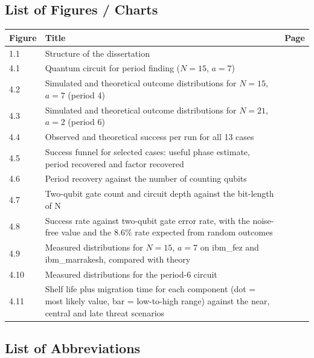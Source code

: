 \documentclass[12pt,oneside]{report}
\begin{document}
\subsection*{List of Figures / Charts}

\begin{center}\small\begin{tabularx}{\textwidth}{|P{0.1\textwidth}|W|P{0.1\textwidth}|}\hline
Figure & Title & Page \\ & Structure of the dissertation & \pageref{fig:1.1} \\ & Quantum circuit for period finding ($N = 15$, $a = 7$) & \pageref{fig:4.1} \\ & Simulated and theoretical outcome distributions for $N = 15$, $a = 7$ (period 4) & \pageref{fig:4.2} \\ & Simulated and theoretical outcome distributions for $N = 21$, $a = 2$ (period 6) & \pageref{fig:4.3} \\ & Observed and theoretical success per run for all 13 cases & \pageref{fig:4.4} \\ & Success funnel for selected cases: useful phase estimate, period recovered and factor recovered & \pageref{fig:4.5} \\ & Period recovery against the number of counting qubits & \pageref{fig:4.6} \\ & Two-qubit gate count and circuit depth against the bit-length of N & \pageref{fig:4.7} \\ & Success rate against two-qubit gate error rate, with the noise-free value and the 8.6\% rate expected from random outcomes & \pageref{fig:4.8} \\ & Measured distributions for $N = 15$, $a = 7$ on ibm\_fez and ibm\_marrakesh, compared with theory & \pageref{fig:4.9} \\ & Measured distributions for the period-6 circuit & \pageref{fig:4.10} \\ & Shelf life plus migration time for each component (dot = most likely value, bar = low-to-high range) against the near, central and late threat scenarios & \pageref{fig:4.11} \\\hline
\end{tabularx}\end{center}

\subsection*{List of Abbreviations}
\end{document}
